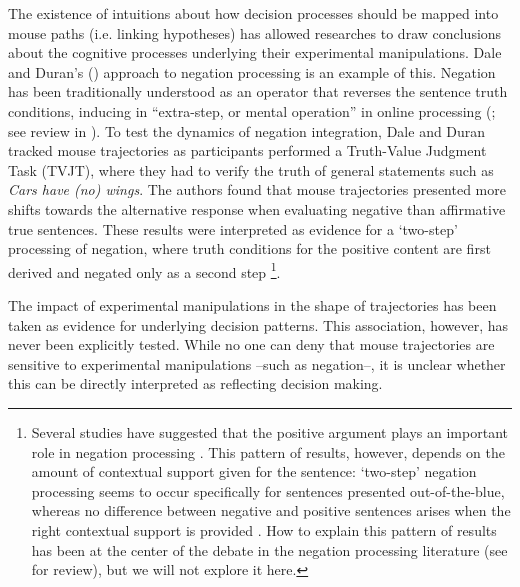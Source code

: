 \documentclass{article}
\begin{document}
The existence of intuitions about how decision processes should be mapped into mouse paths (i.e. linking hypotheses) has allowed researches to draw conclusions about the cognitive processes underlying their experimental manipulations. Dale and Duran's (\citeyear{Dale2011}) approach to negation processing is an example of this.   
Negation has been traditionally understood as an operator that reverses the sentence truth conditions, inducing in ``extra-step, or mental operation'' in online processing (\citealp{wason1965contexts,wason1972psychology}; see review in \citealp{Tian2016}). %
To test the dynamics of negation integration, Dale and Duran tracked mouse trajectories as participants performed a Truth-Value Judgment Task (TVJT), where they had to verify the truth of general statements such as \textit{Cars have (no) wings}.
%
The authors found that mouse trajectories presented more shifts towards the alternative response when evaluating negative than affirmative true sentences. These results were interpreted as evidence for a `two-step' processing of negation, where truth conditions for the positive content are first derived and negated only as a second step%
%
\footnote{Several studies have suggested that the positive argument plays an important role in negation processing \citep[among others]{kaup2007experiential,ludtke2008event}.  
This pattern of results, however, depends on the amount of contextual support given for the sentence: `two-step' negation processing seems to occur specifically for sentences presented out-of-the-blue, whereas no difference between negative and positive sentences arises when the right contextual support is provided \citep{nieuwland2008truth,tian2010we}. How to explain this pattern of results has been at the center of the debate in the negation processing literature (see \citealp{Tian2016} for review), but we will not explore it here.}.

The impact of experimental manipulations in the shape of trajectories has been taken as evidence for underlying decision patterns. This association, however, has never been explicitly tested. While no one can deny that mouse trajectories are sensitive to experimental manipulations --such as negation--, it is unclear whether this can be directly interpreted as reflecting decision making. 
\end{document}

